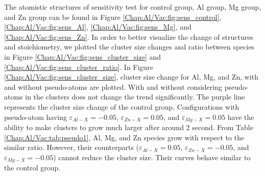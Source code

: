 The atomistic structures of sensitivity test for control group, Al group, Mg group, and Zn group can be found in Figure \ref{Chap:Al/Vac:fig:sens_control}, \ref{Chap:Al/Vac:fig:sens_Al}, \ref{Chap:Al/Vac:fig:sens_Mg}, and \ref{Chap:Al/Vac:fig:sens_Zn}. In order to better visualize the change of structures and stoichiometry, we plotted the cluster size changes and ratio between species in Figure \ref{Chap:Al/Vac:fig:sens_cluster_size} and \ref{Chap:Al/Vac:fig:sens_cluster_ratio}. In Figure \ref{Chap:Al/Vac:fig:sens_cluster_size}, cluster size change for Al, Mg, and Zn, with and without pseudo-atoms are plotted. With and without considering pseudo-atoms in the clusters does not change the trend significantly. The purple line represents the cluster size change of the control group. Configurations with pseudo-atom having  $\varepsilon_{Al-X} = -0.05$, $\varepsilon_{Zn-X} = 0.05$, and $\varepsilon_{Mg-X} = 0.05$ have the ability to make clusters to grow much larger after around 2 second.  From Table \ref{Chap:Al/Vac:tab:pseudo1}, Al, Mg, and Zn species grow with respect to the similar ratio. However, their counterparts ($\varepsilon_{Al-X} = 0.05$, $\varepsilon_{Zn-X} = -0.05$, and $\varepsilon_{Mg-X} = -0.05$) cannot reduce the cluster size. Their curves behave similar to the control group.


